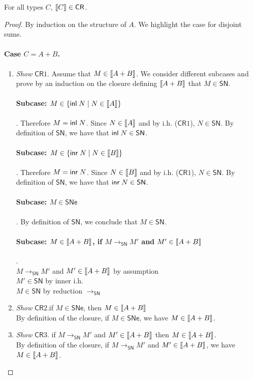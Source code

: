 \documentclass{article}
\newcommand{\SN}{\mathsf{SN}}
\newcommand{\SNe}{\mathsf{SNe}}
\newcommand{\CR}{\textsf{CR}}
\newcommand{\redSN}{\longrightarrow_\SN}
\def\lv{\mathopen{{[\kern-0.14em[}}}    %
\def\rv{\mathclose{{]\kern-0.14em]}}}   %
\newcommand{\den}[1]{\lv #1 \rv}
\begin{document}
\begin{theorem}
For all types $C$, $\den{C}  \in \CR$.
\end{theorem}
\begin{proof}
By induction on the structure of $A$. We highlight the case for disjoint sums.

\paragraph{Case $C = A + B$.} 

  \begin{enumerate}
  \item \textit{Show} $\CR1$. Assume that $M \in \den{A + B}$. We consider different subcases and prove by an induction on the closure defining $\den{A + B}$ that $M \in \SN$.

\paragraph{Subcase: $M \in \{\inl N \mid N \in \den{A}\}$}. Therefore $M = \textsf{inl}\; N$. Since $N \in \den{A}$ and by i.h. ($\CR1$), $N \in \SN$. By definition of $\SN$, we have that $\inl N \in \SN$. 
  
\paragraph{Subcase: $M \in \{\inr N \mid N \in \den{B}\}$}. Therefore $M = \textsf{inr}\; N$. Since $N \in \den{B}$ and by i.h. ($\CR1$), $N \in \SN$. By definition of $\SN$, we have that $\inr N \in \SN$. 

\paragraph{Subcase: $M \in \SNe$}. By definition of $\SN$, we conclude that $M \in \SN$.

\paragraph{Subcase: $M \in \den{A+B}$, if $M \redSN M'$ and $M' \in \den{A+B}$}.
\\[0.5em]
$M \redSN M'$ and $M' \in \den{A + B}$ \hfill by assumption\\
$M' \in \SN$ \hfill by inner i.h. \\ 
$M \in \SN$ \hfill by reduction $\redSN$

 \item \textit{Show} $\CR2$.if $M \in \SNe$, then $M \in \den{A + B}$\\
By definition of the closure, if $M \in \SNe$, we have $M \in \den{A + B}$.


  \item \textit{Show} $\CR3$. if $M \redSN M'$ and $M' \in \den{A+B}$ 
    then $M \in \den{A+B}$.\\
By definition of the closure, if $M \redSN M'$ and $M' \in \den{A+B}$, we have
$M \in \den{A+B}$.
\end{enumerate}

\end{proof}
\end{document}
